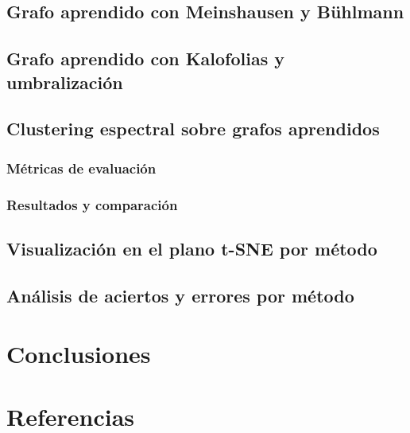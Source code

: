 \documentclass{article}
\begin{document}
\subsection{Grafo aprendido con Meinshausen y Bühlmann}

\subsection{Grafo aprendido con Kalofolias y umbralización}

\subsection{Clustering espectral sobre grafos aprendidos}

\subsubsection{Métricas de evaluación}

\subsubsection{Resultados y comparación}

\subsection{Visualización en el plano t-SNE por método}

\subsection{Análisis de aciertos y errores por método}


\section{Conclusiones}


\section{Referencias}


\end{document}
